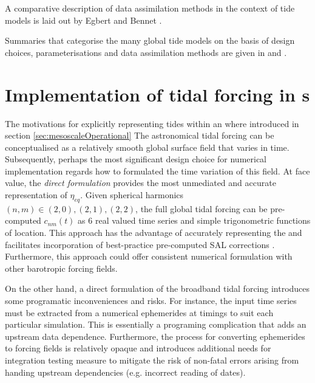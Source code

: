A comparative description of data assimilation methods in the context of tide models is laid out by Egbert and Bennet \cite{Egbert:1996vr}.



Summaries that categorise the many global tide models on the basis of design choices, parameterisations and data assimilation methods are given in \cite{Ardalan:2008gs} and \cite{Matsumoto:2000tg}. \\



\section{Implementation of tidal forcing in \OGCM{}s }
The motivations for explicitly representing tides within an \OGCM{} where introduced in section \ref{sec:mesoscaleOperational}
The astronomical tidal forcing can be conceptualised as a relatively smooth global surface field that varies in time. 
Subsequently, perhaps the most significant design choice for numerical implementation regards how to formulated the time variation of this field.
At face value, the \emph{direct formulation} provides the most unmediated and accurate representation of $\eta_{eq}$. Given spherical harmonics $(n,m) \in (2,0) , (2,1) , (2,2)$, the full global tidal forcing can be pre-computed $c_{nm}(t)$ as 6 real valued time series and simple trigonometric functions of location.
This approach has the advantage of accurately representing the \ATGP{} and facilitates incorporation of best-practice pre-computed SAL corrections \citep{Egbert:2002ug}. 
Furthermore, this approach could offer consistent numerical formulation with other barotropic forcing fields.


On the other hand, a direct formulation of the broadband tidal forcing introduces some programatic inconveniences and risks. 
For instance, the input time series must be extracted from a numerical ephemerides at timings to suit each particular simulation.  This is essentially a programing complication that adds an upstream data dependence.
Furthermore, the process for converting ephemerides to forcing fields is relatively opaque and introduces additional needs for integration testing measure to mitigate the risk of non-fatal errors arising from handing upstream dependencies (e.g. incorrect reading of dates).

